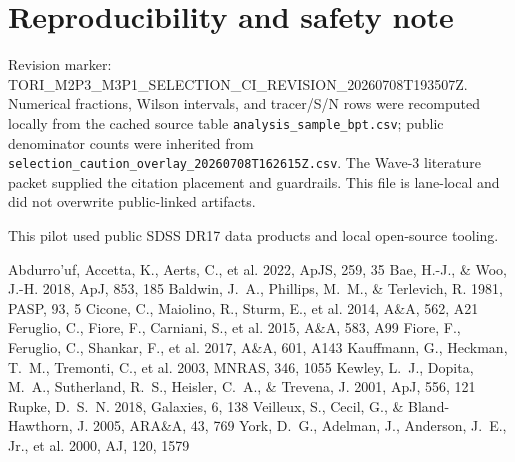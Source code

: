 \documentclass[twocolumn]{aastex631}
\begin{document}
\section*{Reproducibility and safety note}
Revision marker: TORI\_M2P3\_M3P1\_SELECTION\_CI\_REVISION\_20260708T193507Z.  Numerical fractions, Wilson intervals, and tracer/S/N rows were recomputed locally from the cached source table \texttt{analysis\_sample\_bpt.csv}; public denominator counts were inherited from \texttt{selection\_caution\_overlay\_20260708T162615Z.csv}.  The Wave-3 literature packet supplied the citation placement and guardrails.  This file is lane-local and did not overwrite public-linked artifacts.

\acknowledgments
This pilot used public SDSS DR17 data products and local open-source tooling.

\begin{thebibliography}{}
 Abdurro'uf, Accetta, K., Aerts, C., et al. 2022, ApJS, 259, 35
 Bae, H.-J., \& Woo, J.-H. 2018, ApJ, 853, 185
 Baldwin, J.~A., Phillips, M.~M., \& Terlevich, R. 1981, PASP, 93, 5
 Cicone, C., Maiolino, R., Sturm, E., et al. 2014, A\&A, 562, A21
 Feruglio, C., Fiore, F., Carniani, S., et al. 2015, A\&A, 583, A99
 Fiore, F., Feruglio, C., Shankar, F., et al. 2017, A\&A, 601, A143
 Kauffmann, G., Heckman, T.~M., Tremonti, C., et al. 2003, MNRAS, 346, 1055
 Kewley, L.~J., Dopita, M.~A., Sutherland, R.~S., Heisler, C.~A., \& Trevena, J. 2001, ApJ, 556, 121
 Rupke, D.~S.~N. 2018, Galaxies, 6, 138
 Veilleux, S., Cecil, G., \& Bland-Hawthorn, J. 2005, ARA\&A, 43, 769
 York, D.~G., Adelman, J., Anderson, J.~E., Jr., et al. 2000, AJ, 120, 1579
\end{thebibliography}
\end{document}

